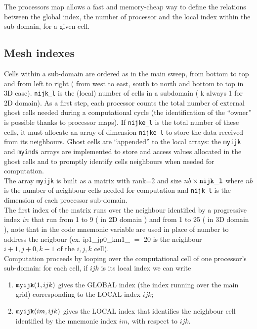 \begin{enumerate}
The processors map allows a fast and memory-cheap way to define the relations
between the global index, the number of processor and the local index 
within the sub-domain, for a given cell.\\
%
\subsection{Mesh indexes}
Cells within a sub-domain are ordered as in the main sweep, from bottom to top and
from left to right ( from west to east, south to north and bottom to top in 3D case). 
{\tt nijk\_l} is the (local) number of cells in a subdomain ( k always 1 for 2D domain).
As a first step, each processor counts the total number of external ghost cells
needed during a computational cycle (the identification of the ``owner'' is 
possible thanks to processor maps). If {\tt nijke\_l} is the total number of these 
cells, it must allocate an array of dimension {\tt nijke\_l} to store the data received
from its neighbours. Ghost cells are ``appended'' to the local arrays:
the {\tt myijk} and {\tt myinds} arrays are implemented
 to store and access values allocated in the ghost cells and to promptly
identify cells neighbours when needed for computation.\\
The array {\tt myijk} is built as a matrix with rank=2 and size 
$nb \times {\tt nijk\_l}$ where $nb$ is the number of neighbour cells 
needed for computation and {\tt nijk\_l} is the dimension of each processor
sub-domain.\\
The first index of the matrix runs over the neighbour identified by a progressive
index $in$ that run from 1 to 9 ( in 2D domain ) and from 1 to 25 ( in 3D domain ),
note that in the code mnemonic variable are used in place of number to address
the neigbour (ex. ip1_jp0_km1_ $=$ 20 is the neighbour $i+1,j+0,k-1$ of the $i,j,k$
cell).\\ 
Computation proceeds by looping  over the computational
cell of one processor's sub-domain: for each cell, if $ijk$ is its local index
we can write
\begin{enumerate}
\item ${\tt myijk}( 1,ijk)$ gives the GLOBAL index (the index running 
      over the main grid) corresponding to the LOCAL index $ijk$;
\item ${\tt myijk}( im,ijk)$ gives the LOCAL index that identifies the neighbour
      cell identified by the mnemonic index $im$, with respect to $ijk$. 
\end{enumerate}


\end{enumerate}
